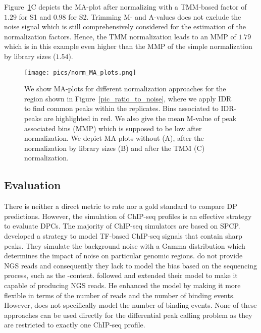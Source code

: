 Figure~\ref{pic_norms_maplot}C depicts the MA-plot after normalizing with a TMM-based factor of $1.29$ for S1 and $0.98$ for S2.
Trimming M- and A-values does not exclude the noise signal which is still comprehensively considered for the estimation of the normalization factors.
Hence, the TMM normalization leads to an MMP of $1.79$ which is in this example even higher than the MMP of the simple normalization by library sizes ($1.54$).


\begin{figure}[ht]
  \centering
  \texttt{[image: pics/norm\_MA\_plots.png]}
\caption[MA-plots for different normalization approaches]{We show MA-plots for different normalization approaches for the region shown in Figure~\ref{pic_ratio_to_noise}, where we apply IDR to find common peaks within the replicates.
Bins associated to IDR-peaks are highlighted in red.
We also give the mean M-value of peak associated bins (MMP) which is supposed to be low after normalization. 
We depict MA-plots without (A), after the normalization by library sizes (B) and after the TMM (C) normalization.
}
\label{pic_norms_maplot}
\end{figure}

\subsection{Evaluation}
\label{sec_sim_previous_work}
There is neither a direct metric to rate nor a gold standard to compare DP predictions.
However, the simulation of ChIP-seq profiles is an effective strategy to evaluate DPCs.
The majority of ChIP-seq simulators are based on SPCP.
\cite{zhang2008} developed a strategy to model TF-based ChIP-seq signals that contain sharp peaks. 
They simulate the background noise with a Gamma distribution which determines the impact of noise on particular genomic regions.
\cite{zhang2008} do not provide NGS reads and consequently they lack to model the bias based on the sequencing process, such as the -content.
\cite{humburg2011} followed \cite{zhang2008} and extended their model to make it capable of producing NGS reads.
He enhanced the model by making it more flexible in terms of the number of reads and the number of binding events.
However, \cite{humburg2011} does not specifically model the number of binding events.
None of these approaches can be used directly for the differential peak calling problem as they are restricted to exactly one ChIP-seq profile.

